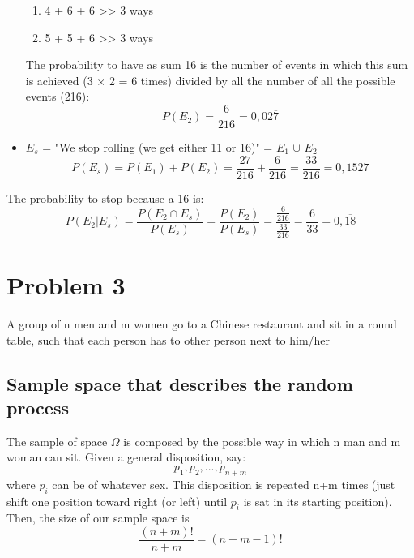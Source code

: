\documentclass[oneside]{article}			%
\begin{document}
\begin{itemize}
			\begin{enumerate}[label=(\alph*)]
				\item 4 + 6 + 6 >> 3 ways
				\item 5 + 5 + 6 >> 3 ways
			\end{enumerate}
			The probability to have as sum 16 is the number of events in which this sum is achieved (3 $\times$ 2 = 6 times) divided by all the number of all the possible events (216):
			\[P(E_2) = \frac{6}{216} = 0,02\overline{7}\]
		\item $E_s$ = "We stop rolling (we get either 11 or 16)" = $E_1$ $\cup$ $E_2$
		\[P(E_s) = P(E_1) + P(E_2) = \frac{27}{216} + \frac{6}{216} = \frac{33}{216} = 0,152\overline{7}\]
	\end{itemize}
	The probability to stop because a 16 is:
	\\
	\[ P(E_2|E_s) = \frac{P(E_2 \cap E_s)}{P(E_s)} = \frac{P(E_2)}{P(E_s)} = \frac{\frac{6}{216}}{\frac{33}{216}} = \frac{6}{33} = 0,\overline{18} \]


	\clearpage				%
	\setcounter{section}{3}		%
	\setcounter{subsection}{0}		%
	\section*{Problem 3}
	A group of n men and m women go to a Chinese restaurant and sit in a round table, such that each person has to other person next to him/her
	\subsection{Sample space that describes the random process}
	The sample of space $\Omega$ is composed by the possible way in which n man and m woman can sit. Given a general disposition, say:
	\[p_1, p_2, ... , p_{n+m} \]
	where $p_i$ can be of whatever sex. This disposition is repeated n+m times (just shift one position toward right (or left) until $p_i$ is sat in its starting position).
	\\
	Then, the size of our sample space is \[ \frac{(n+m)!}{n+m} = (n+m-1)!\]
\end{document}
